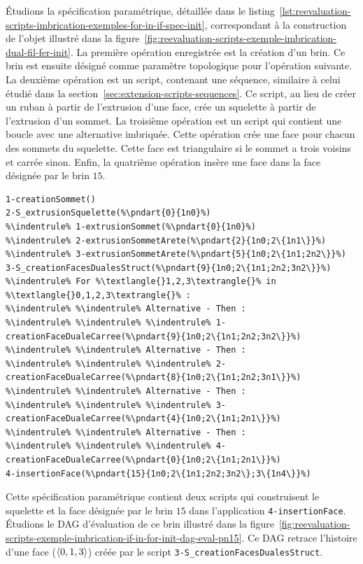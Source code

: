 Étudions la spécification paramétrique, détaillée dans le
listing~\ref{lst:reevaluation-scripts-imbrication-exemples-for-in-if-spec-init},
correspondant à la construction de l'objet illustré dans la
figure~\ref{fig:reevaluation-scripts-exemple-imbrication-dual-fil-fer-init}. %
La première opération enregistrée est la création d'un brin. %
Ce brin est ensuite désigné comme paramètre topologique pour l'opération
suivante. %
La deuxième opération est un script, contenant une séquence, similaire à celui
étudié dans la section~\ref{sec:extension-scripts-sequences}. %
Ce script, au lieu de créer un ruban à partir de l'extrusion d'une face, crée un
squelette à partir de l'extrusion d'un sommet. %
La troisième opération est un script qui contient une boucle avec une
alternative imbriquée. %
Cette opération crée une face pour chacun des sommets du squelette. %
Cette face est triangulaire si le sommet a trois voisins et carrée sinon. %
Enfin, la quatrième opération insère une face dans la face désignée par le brin
\(15\). %

\begin{lstlisting}[style=script-style,
escapechar=\%,
caption=Spécification paramétrique initiale de la création du dual d'un chemin 1D,
label=lst:reevaluation-scripts-imbrication-exemples-for-in-if-spec-init,
captionpos=b]
1-creationSommet()
2-S_extrusionSquelette(%\pndart{0}{1n0}%)
%\indentrule% 1-extrusionSommet(%\pndart{0}{1n0}%)
%\indentrule% 2-extrusionSommetArete(%\pndart{2}{1n0;2\{1n1\}}%)
%\indentrule% 3-extrusionSommetArete(%\pndart{5}{1n0;2\{1n1;2n2\}}%)
3-S_creationFacesDualesStruct(%\pndart{9}{1n0;2\{1n1;2n2;3n2\}}%)
%\indentrule% For %\textlangle{}1,2,3\textrangle{}% in %\textlangle{}0,1,2,3\textrangle{}% :
%\indentrule% %\indentrule% Alternative - Then :
%\indentrule% %\indentrule% %\indentrule% 1-creationFaceDualeCarree(%\pndart{9}{1n0;2\{1n1;2n2;3n2\}}%)
%\indentrule% %\indentrule% Alternative - Then :
%\indentrule% %\indentrule% %\indentrule% 2-creationFaceDualeCarree(%\pndart{8}{1n0;2\{1n1;2n2;3n1\}}%)
%\indentrule% %\indentrule% Alternative - Then :
%\indentrule% %\indentrule% %\indentrule% 3-creationFaceDualeCarree(%\pndart{4}{1n0;2\{1n1;2n1\}}%)
%\indentrule% %\indentrule% Alternative - Then :
%\indentrule% %\indentrule% %\indentrule% 4-creationFaceDualeCarree(%\pndart{0}{1n0;2\{1n1;2n1\}}%)
4-insertionFace(%\pndart{15}{1n0;2\{1n1;2n2;3n2\};3\{1n4\}}%)
\end{lstlisting}



Cette spécification paramétrique contient deux scripts qui construisent le squelette et la face désignée par le brin \(15\) dans l'application
\texttt{4-insertionFace}. %
Étudions le DAG d'évaluation de ce brin illustré dans la
figure~\ref{fig:reevaluation-scripts-exemple-imbrication-if-in-for-init-dag-eval-pn15}. %
Ce DAG retrace l'histoire d'une face (\(\langle0,1,3\rangle\)) créée par le script
\texttt{3\allowbreak{}-\allowbreak{}S\allowbreak{}\_\allowbreak{}creation\-Faces\-Duales\-Struct}. %

